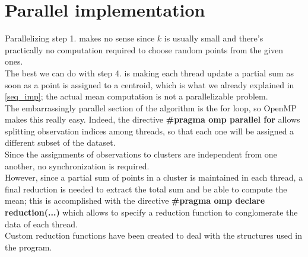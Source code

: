 \documentclass[10pt,twocolumn,letterpaper]{article}
\begin{document}
\section{Parallel implementation}
Parallelizing step 1. makes no sense since $k$ is usually small and there's practically no computation required to choose random points from the given ones.\\
The best we can do with step 4. is making each thread update a partial sum as soon as a point is assigned to a centroid, which is what we already explained in \cref{seq_imp}; the actual mean computation is not a parallelizable problem.\\
The embarrassingly parallel section of the algorithm is the for loop, so OpenMP makes this really easy. Indeed, the directive \textbf{\#pragma omp parallel for} allows splitting observation indices among threads, so that each one will be assigned a different subset of the dataset.\\
Since the assignments of observations to clusters are independent from one another, no synchronization is required.\\
However, since a partial sum of points in a cluster is maintained in each thread, a final reduction is needed to extract the total sum and be able to compute the mean; this is accomplished with the directive \textbf{\#pragma omp declare reduction(...)} which allows to specify a reduction function to conglomerate the data of each thread.\\
Custom reduction functions have been created to deal with the structures used in the program.
\end{document}
